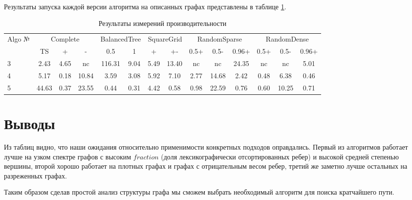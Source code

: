 \FloatBarrier
Результаты запуска каждой версии алгоритма на описанных графах представлены в таблице \ref{graph_description}.
\begin{table}[H]
\centering

\begin{tabular}{l|ccc|cc|cc|ccc|ccc}  
Algo №& \multicolumn{3}{c}{Complete} & \multicolumn{2}{c}{BalancedTree} & \multicolumn{2}{c}{SquareGrid} & \multicolumn{3}{c}{RandomSparse} & \multicolumn{3}{c}{RandomDense}\\
& TS & + & - & 0.5 & 1 & + & +- & 0.5+  & 0.5- & 0.96+ & 0.5+ & 0.5- & 0.96+\\
\hline\hline
3 & 2.43 & 4.65 & nc & 116.31 & 9.04 & 5.49 & 13.40 & nc & nc & 24.35 & nc & nc & 5.01 \\  
4 & 5.17 & 0.18 & 10.84 & 3.59 & 3.08 & 5.92 & 7.10 & 2.77 & 14.68 & 2.42 & 0.48  & 6.38  & 0.46 \\
5 & 44.63 & 0.37 & 23.55 & 0.44 & 0.31 & 4.42 & 0.58 & 0.98 & 22.59 & 0.76  & 0.60  & 10.25 & 0.71 \\
\hline
\end{tabular}

\caption{Результаты измерений производительности}
\label{graph_description}
\end{table}

\FloatBarrier
\section{Выводы}

Из таблиц видно, что наши ожидания относительно применимости конкретных подходов оправдались. Первый из алгоритмов работает лучше на узком спектре графов с высоким $fraction$ (доля лексикографически отсортированных ребер) и высокой средней степенью вершины, второй хорошо работает на плотных графах и графах с отрицательным весом ребер, третий же заметно лучше остальных на разреженных графах.

Таким образом сделав простой анализ структуры графа мы сможем выбрать необходимый алгоритм для поиска кратчайшего пути. 
\FloatBarrier
